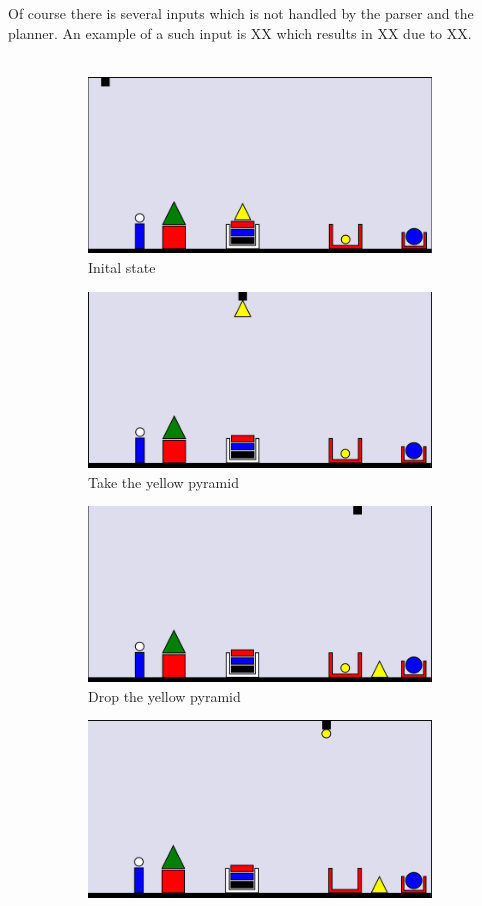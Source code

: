 Of course there is several inputs which is not handled by the parser and the planner. An example of a such input is XX which results in XX due to XX. \\\\
\begin{figure}
\centering
\begin{subfigure}{.5\textwidth}
  \centering
  \includegraphics[width=.7\linewidth]{fig/1.png}
  \caption{Inital state}
  \label{fig:1}
\end{subfigure}%
\begin{subfigure}{.5\textwidth}
  \centering
  \includegraphics[width=.7\linewidth]{fig/2.png}
  \caption{Take the yellow pyramid}
  \label{fig:2}
\end{subfigure}
\begin{subfigure}{.5\textwidth}
  \centering
  \includegraphics[width=.7\linewidth]{fig/3.png}
  \caption{Drop the yellow pyramid}
  \label{fig:3}
\end{subfigure}%
\begin{subfigure}{.5\textwidth}
  \centering
  \includegraphics[width=.7\linewidth]{fig/4.png}

\end{subfigure}
\end{figure}
